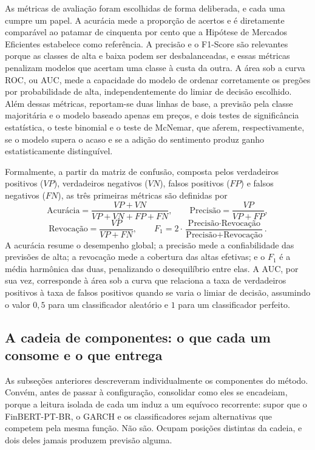 As métricas de avaliação foram escolhidas de forma deliberada, e cada uma cumpre um papel. A acurácia mede a proporção de acertos e é diretamente comparável ao patamar de cinquenta por cento que a Hipótese de Mercados Eficientes estabelece como referência. A precisão e o F1-Score são relevantes porque as classes de alta e baixa podem ser desbalanceadas, e essas métricas penalizam modelos que acertam uma classe à custa da outra. A área sob a curva ROC, ou AUC, mede a capacidade do modelo de ordenar corretamente os pregões por probabilidade de alta, independentemente do limiar de decisão escolhido. Além dessas métricas, reportam-se duas linhas de base, a previsão pela classe majoritária e o modelo baseado apenas em preços, e dois testes de significância estatística, o teste binomial e o teste de McNemar, que aferem, respectivamente, se o modelo supera o acaso e se a adição do sentimento produz ganho estatisticamente distinguível.

Formalmente, a partir da matriz de confusão, composta pelos verdadeiros positivos ($VP$), verdadeiros negativos ($VN$), falsos positivos ($FP$) e falsos negativos ($FN$), as três primeiras métricas são definidas por
\begin{equation}
\text{Acurácia} = \frac{VP + VN}{VP + VN + FP + FN}, \qquad \text{Precisão} = \frac{VP}{VP + FP},
\end{equation}
\begin{equation}
\text{Revocação} = \frac{VP}{VP + FN}, \qquad F_1 = 2 \cdot \frac{\text{Precisão} \cdot \text{Revocação}}{\text{Precisão} + \text{Revocação}}.
\end{equation}
A acurácia resume o desempenho global; a precisão mede a confiabilidade das previsões de alta; a revocação mede a cobertura das altas efetivas; e o $F_1$ é a média harmônica das duas, penalizando o desequilíbrio entre elas. A AUC, por sua vez, corresponde à área sob a curva que relaciona a taxa de verdadeiros positivos à taxa de falsos positivos quando se varia o limiar de decisão, assumindo o valor $0{,}5$ para um classificador aleatório e $1$ para um classificador perfeito.

\subsection{A cadeia de componentes: o que cada um consome e o que entrega}
\label{sec:cadeia_componentes}

As subseções anteriores descreveram individualmente os componentes do método. Convém, antes de passar à configuração, consolidar como eles se encadeiam, porque a leitura isolada de cada um induz a um equívoco recorrente: supor que o FinBERT-PT-BR, o GARCH e os classificadores sejam alternativas que competem pela mesma função. Não são. Ocupam posições distintas da cadeia, e dois deles jamais produzem previsão alguma.

